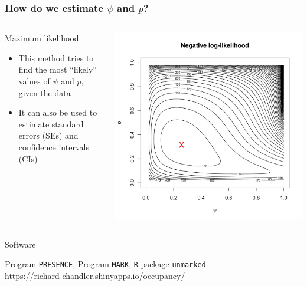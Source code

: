 \documentclass[color=usenames,dvipsnames]{beamer}\usepackage[]{graphicx}\usepackage[]{xcolor}
\begin{document}
\begin{frame}
  \frametitle{How do we estimate $\psi$ and $p$?}
  \pause
  \begin{columns}
    \begin{column}{0.6\textwidth}
      \large {%
        Maximum likelihood \par}
      \large
      \begin{itemize}%
      \item This method tries to find the most ``likely'' values of
        $\psi$ and $p$, given the data
      \item It can also be used to estimate standard errors (SEs) and
        confidence intervals (CIs)
      \end{itemize}
    \end{column}
    \pause
    \begin{column}{0.4\textwidth}
      \includegraphics[width=\textwidth]{figs/mlePandPsi}
    \end{column}
  \end{columns}
  \pause
  {%
    Software \par}
  Program {\tt PRESENCE}, Program {\tt MARK}, {\tt R} package {\tt unmarked} \\
  \vfill
  \centering
  \url{https://richard-chandler.shinyapps.io/occupancy/} \\
\end{frame}
\end{document}
